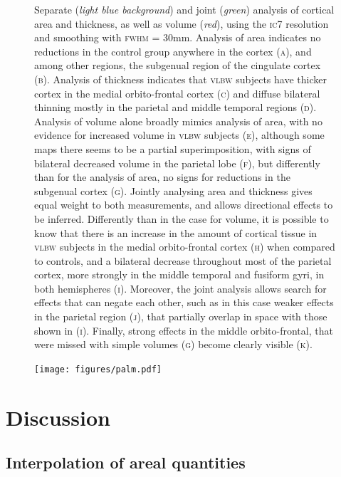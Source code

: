 \begin{figure}[!b]
\centering
\caption{Separate (\emph{light blue background}) and joint (\emph{green}) analysis of cortical area and thickness, as well as volume (\emph{red}), using the \textsc{ic}7 resolution and smoothing with \textsc{fwhm} = 30mm. Analysis of area indicates no reductions in the control group anywhere in the cortex (\textsc{a}), and among other regions, the subgenual region of the cingulate cortex (\textsc{b}). Analysis of thickness indicates that \textsc{vlbw} subjects have thicker cortex in the medial orbito-frontal cortex (\textsc{c}) and diffuse bilateral thinning mostly in the parietal and middle temporal regions (\textsc{d}). Analysis of volume alone broadly mimics analysis of area, with no evidence for increased volume in \textsc{vlbw} subjects (\textsc{e}), although some maps there seems to be a partial superimposition, with signs of bilateral decreased volume in the parietal lobe (\textsc{f}), but differently than for the analysis of area, no signs for reductions in the subgenual cortex (\textsc{g}). Jointly analysing area and thickness gives equal weight to both measurements, and allows directional effects to be inferred. Differently than in the case for volume, it is possible to know that there is an increase in the amount of cortical tissue in \textsc{vlbw} subjects in the medial orbito-frontal cortex (\textsc{h}) when compared to controls, and a bilateral decrease throughout most of the parietal cortex, more strongly in the middle temporal and fusiform gyri, in both hemispheres (\textsc{i}). Moreover, the joint analysis allows search for effects that can negate each other, such as in this case weaker effects in the parietal region (\textsc{j}), that partially overlap in space with those shown in (\textsc{i}). Finally, strong effects in the middle orbito-frontal, that were missed with simple volumes (\textsc{g}) become clearly visible (\textsc{k}).}
\label{fig:palm}
\end{figure}

\begin{figure}[!p]
\centering
\texttt{[image: figures/palm.pdf]}
\label{fig:palm_noref}
\end{figure}

\section{Discussion}

\subsection{Interpolation of areal quantities}


